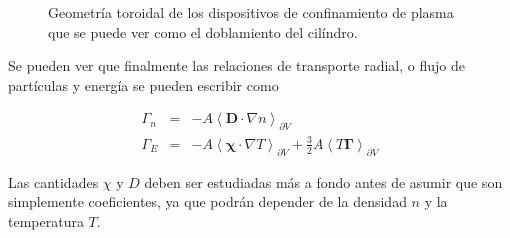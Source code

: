  \begin{figure}[htb!]
    \centering
    \caption{Geometr\'ia toroidal de los dispositivos de confinamiento de plasma que se puede ver como el doblamiento del cil\'indro.}
    \label{fig:tor}
  \end{figure}

Se pueden ver que finalmente las relaciones de transporte radial, o flujo de part\'iculas y energ\'ia se pueden escribir como

  \begin{eqnarray}
    \Gamma_n &=& -A\left<\textbf{D}\cdot\nabla n\right>_{\partial V} \label{eq:partflux}\\
    \Gamma_E &=& -A\left<\pmb{\chi}\cdot\nabla T\right>_{\partial V} + \frac{3}{2}A\left<T\pmb{\Gamma}\right>_{\partial V}\label{eq:energyflux}
    \end{eqnarray}
    
  Las cantidades $\chi$ y $D$ deben ser estudiadas m\'as a fondo antes de asumir que son simplemente coeficientes, ya que podr\'an depender de la densidad $n$ y la temperatura $T$.
